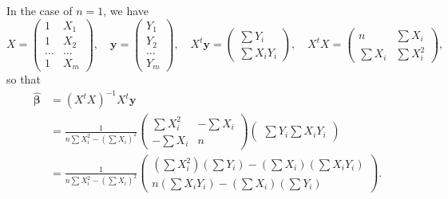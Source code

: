In the case of $n = 1$, we have
\begin{equation*}
    X = \begin{pmatrix}
        1 & X_1 \\
        1 & X_2 \\
        \ldots & \ldots \\
        1 & X_m
    \end{pmatrix}, \quad
    \bm{y} = \begin{pmatrix}
        Y_1 \\
        Y_2 \\
        \ldots \\
        Y_m
    \end{pmatrix}, \quad
    X^t \bm{y} = \begin{pmatrix}
        \sum Y_i \\
        \sum X_i Y_i
    \end{pmatrix}, \quad
    X^t X = \begin{pmatrix}
        n & \sum X_i \\
        \sum X_i & \sum X_i^2
    \end{pmatrix},
\end{equation*}
so that
\begin{equation*}
    \begin{split}
        \hat{\bm{\beta}}
            &= (X^t X)^{-1} X^t \bm{y} \\
            &=  \frac{1}{n \sum X_i^2 - \left(\sum X_i\right)^2}
                \begin{pmatrix}
                    \sum X_i^2 & -\sum X_i \\
                    -\sum X_i & n
                \end{pmatrix}
                \begin{pmatrix}
                    \sum Y_i
                    \sum X_i Y_i
                \end{pmatrix} \\
            &= \frac{1}{n \sum X_i^2 - \left(\sum X_i\right)^2}
                \begin{pmatrix}
                    \left(\sum X_i^2\right)\left(\sum Y_i\right) - \left(\sum X_i\right)\left(\sum X_i Y_i\right) \\
                    n \left(\sum X_i Y_i\right) - \left(\sum X_i\right)\left(\sum Y_i\right)
                \end{pmatrix}.
    \end{split}
\end{equation*}
